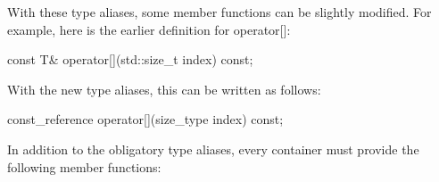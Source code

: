 With these type aliases, some member functions can be slightly modified. For example, here is the earlier definition for operator[]:

\begin{cpp}
const T& operator[](std::size_t index) const;
\end{cpp}

With the new type aliases, this can be written as follows:

\begin{cpp}
const_reference operator[](size_type index) const;
\end{cpp}


In addition to the obligatory type aliases, every container must provide the following member functions:

